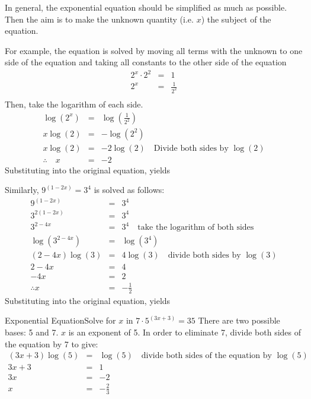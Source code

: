 In general, the exponential equation should be simplified as much as possible. Then the aim is to make the unknown quantity (i.e. $x$) the subject of the equation.

For example, the equation
is solved by moving all terms with the unknown to one side of the equation and taking all constants to the other side of the equation
\begin{eqnarray*}
2^x\cdot2^2&=&1\\
2^x &=&\frac{1}{2^2}\\
\end{eqnarray*}
Then, take the logarithm of each side.
\begin{eqnarray*}
\log{(2^x)} &=&\log{(\frac{1}{2^2})}\\
x\log{(2)} &=&-\log{(2^2)}\\
x\log{(2)} &=&-2\log{(2)} \quad \mbox{Divide both sides by $\log{(2)}$}\\
\therefore \quad x&=&-2
\end{eqnarray*}
Substituting into the original equation, yields

Similarly, $9^{(1-2x)}=3^4$ is solved as follows:
\begin{eqnarray*}
9^{(1-2x)}&=&3^4\\
3^{2(1-2x)}&=&3^4\\
3^{2-4x}&=&3^4 \quad \mbox{take the logarithm of both sides}\\
\log(3^{2-4x})&=&\log(3^4)\\
(2-4x)\log(3)&=&4\log(3) \quad \mbox{divide both sides by $\log(3)$}\\
2-4x&=&4\\
-4x&=&2\\
\therefore x&=&-\frac{1}{2}
\end{eqnarray*}
Substituting into the original equation, yields

\begin{wex}{Exponential Equation}{Solve for $x$ in $7 \cdot 5^{(3x+3)}=35$}{
There are two possible bases: 5 and 7. $x$ is an exponent of 5.
In order to eliminate 7, divide both sides of the equation by 7 to give:
\begin{eqnarray*}
(3x+3)\log(5)&=&\log(5)\quad \mbox{divide both sides of the equation by $\log(5)$}\\
3x+3&=&1\\
3x&=&-2\\
x&=&-\frac{2}{3}
\end{eqnarray*}
}\end{wex}


